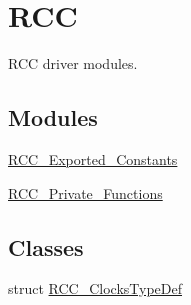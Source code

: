 \hypertarget{group___r_c_c}{}\section{R\+CC}
\label{group___r_c_c}


R\+CC driver modules.  


\subsection*{Modules}
\begin{DoxyCompactItemize}
\item 
\hyperlink{group___r_c_c___exported___constants}{R\+C\+C\+\_\+\+Exported\+\_\+\+Constants}
\item 
\hyperlink{group___r_c_c___private___functions}{R\+C\+C\+\_\+\+Private\+\_\+\+Functions}
\end{DoxyCompactItemize}
\subsection*{Classes}
\begin{DoxyCompactItemize}
\item 
struct \hyperlink{struct_r_c_c___clocks_type_def}{R\+C\+C\+\_\+\+Clocks\+Type\+Def}
\end{DoxyCompactItemize}
